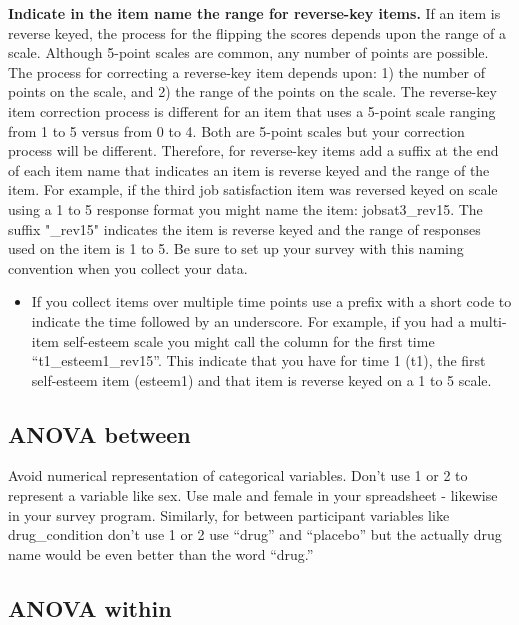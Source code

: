 \documentclass[
]{krantz}
\providecommand{\tightlist}{%
  \setlength{\itemsep}{0pt}\setlength{\parskip}{0pt}}
\begin{document}
\textbf{Indicate in the item name the range for reverse-key items.} If an item is reverse keyed, the process for the flipping the scores depends upon the range of a scale. Although 5-point scales are common, any number of points are possible. The process for correcting a reverse-key item depends upon: 1) the number of points on the scale, and 2) the range of the points on the scale. The reverse-key item correction process is different for an item that uses a 5-point scale ranging from 1 to 5 versus from 0 to 4. Both are 5-point scales but your correction process will be different. Therefore, for reverse-key items add a suffix at the end of each item name that indicates an item is reverse keyed and the range of the item. For example, if the third job satisfaction item was reversed keyed on scale using a 1 to 5 response format you might name the item: jobsat3\_rev15. The suffix "\_rev15" indicates the item is reverse keyed and the range of responses used on the item is 1 to 5. Be sure to set up your survey with this naming convention when you collect your data.

\begin{itemize}
\tightlist
\item
  If you collect items over multiple time points use a prefix with a short code to indicate the time followed by an underscore. For example, if you had a multi-item self-esteem scale you might call the column for the first time ``t1\_esteem1\_rev15''. This indicate that you have for time 1 (t1), the first self-esteem item (esteem1) and that item is reverse keyed on a 1 to 5 scale.
\end{itemize}

\hypertarget{anova-between}{%
\subsection{ANOVA between}\label{anova-between}}

Avoid numerical representation of categorical variables. Don't use 1 or 2 to represent a variable like sex. Use male and female in your spreadsheet - likewise in your survey program. Similarly, for between participant variables like drug\_condition don't use 1 or 2 use ``drug'' and ``placebo'' but the actually drug name would be even better than the word ``drug.''

\hypertarget{anova-within}{%
\subsection{ANOVA within}\label{anova-within}}
\end{document}
